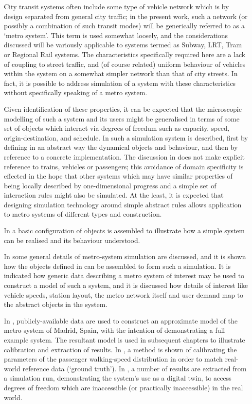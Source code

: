 
City transit systems often include some type of vehicle network which
is by design separated from general city traffic; in the present work,
such a network (or possibly a combination of such transit modes) will
be generically referred to as a `metro system'.  This term is used
somewhat loosely, and the considerations discussed will be variously
applicable to systems termed as Subway, LRT, Tram or Regional Rail
systems. The characteristics specifically required here are a lack of
coupling to street traffic, and (of course related) uniform behaviour
of vehicles within the system on a somewhat simpler network than that
of city streets. In fact, it is possible to address simulation of a
system with these characteristics without specifically speaking of a
metro system.

Given identification of these properties, it can be expected that the
microscopic modelling of such a system and its users might be
generalised in terms of some set of objects which interact via degrees
of freedum such as capacity, speed, origin-destination, and schedule.
In  such a simulation system is described, first by
defining in an abstract way the dynamical objects and behaviour, and
then by reference to a concrete implementation. The discussion
in  does not make explicit reference to trains,
vehicles or passengers; this avoidance of domain specificity is effected in
the hope that other systems which may have similar properties of being
locally described by one-dimensional progress and a simple set of
interaction rules might also be simulated. At the least, it is
expected that designing simulation technology around simple abstract
rules allows application to metro systems of different types and
construction.

In  a basic configuration of objects is assembled
to illustrate how a simple system can be realised and its behaviour
understood.

In  some general details of metro-system
simulation are discussed, and it is shown how the objects defined in
 can be assembled to form such a simulation. It is
indicated how generic data describing a metro system of interest may
be used to construct a model of such a system, and it is discussed how
details of interest like vehicle speeds, station layout, the metro
network itself and user demand map to the abstract objects in the
system.

In , publicly-available data are used to
construct an approximate model of the metro system of Madrid, Spain,
with the intention of demonstrating a full example system. The
resultant model is used in subsequent chapters to illustrate
calibration and extraction of results.  In , a
method is shown of calibrating the parameters of the passenger
walking-speed distribution in order to match real-world reference data
(`ground truth').  In , a number of results are
extracted from a simulation run, demonstrating the system's use as a
digital twin, to access degrees of freedom which are inaccessible (or
practically inaccessible) in the real world.


